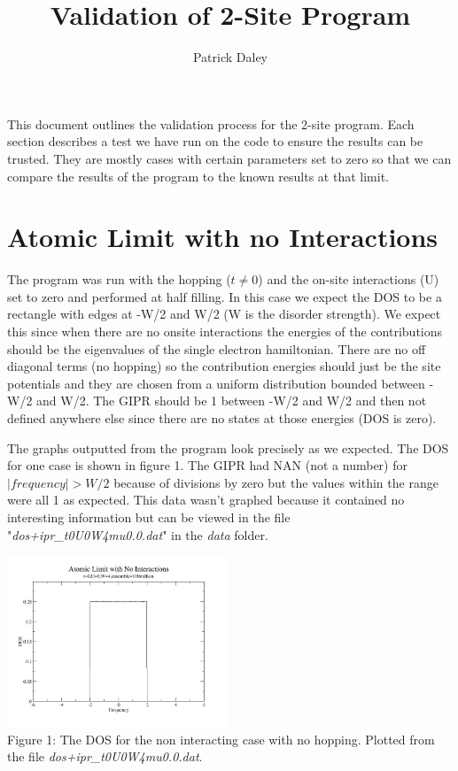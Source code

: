 \documentclass{article}
\author{Patrick Daley}
\title{Validation of 2-Site Program}
\begin{document}
\maketitle

This document outlines the validation process for the 2-site program. Each section describes a test we have run on the code to ensure the results can be trusted. They are mostly cases with certain parameters set to zero so that we can compare the results of the program to the known results at that limit. 

\section{Atomic Limit with no Interactions}
The program was run with the hopping ($t\ne0$) and the on-site interactions (U) set to zero and performed at half filling. In this case we expect the DOS to be a rectangle with edges at -W/2 and W/2 (W is the disorder strength). We expect this since when there are no onsite interactions the energies of the contributions should be the eigenvalues of the single electron hamiltonian. There are no off diagonal terms (no hopping) so the contribution energies should just be the site potentials and they are chosen from a uniform distribution bounded between -W/2 and W/2. The GIPR should be 1 between -W/2 and W/2 and then not defined anywhere else since there are no states at those energies (DOS is zero).

The graphs outputted from the program look precisely as we expected.  The DOS for one case is shown in figure 1. The GIPR had NAN (not a number) for $ | frequency | > W/2 $ because of divisions by zero but the values within the range were all 1 as expected. This data wasn't graphed because it contained no interesting information but can be viewed in the file "\textit{dos+ipr\_t0U0W4mu0.0.dat}" in the \textit{data} folder.

\begin{center}
	\includegraphics[width=250px]{dos2_t0u0w4.jpg} \\
	Figure 1: The DOS for the non interacting case with no hopping. Plotted from the file \textit{dos+ipr\_t0U0W4mu0.0.dat}.
\end{center}
\end{document}
